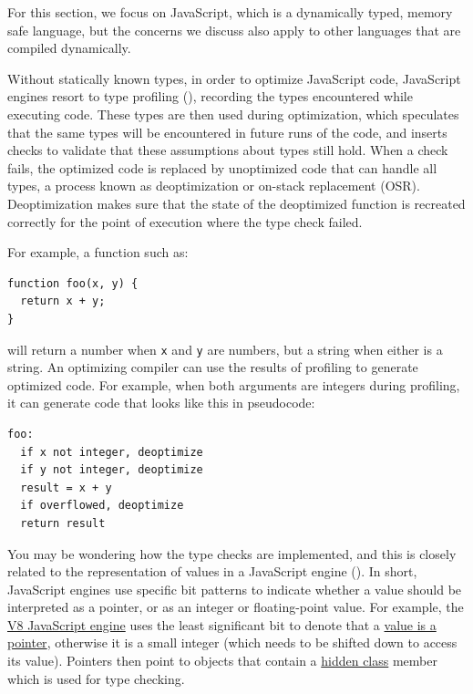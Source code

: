 \documentclass[
  a4paper,
]{report}
\begin{document}
For this section, we focus on JavaScript, which is a dynamically typed,
memory safe language, but the concerns we discuss also apply to other
languages that are compiled dynamically.

Without statically known types, in order to optimize JavaScript code,
JavaScript engines resort to type profiling
(), recording the types encountered
while executing code. These types are then used during optimization,
which speculates that the same types will be encountered in future runs
of the code, and inserts checks to validate that these assumptions about
types still hold. When a check fails, the optimized code is replaced by
unoptimized code that can handle all types, a process known as
\label{__index_entry_93}{deoptimization}
or \label{__index_entry_94}{on-stack replacement
(OSR)}. Deoptimization makes sure that
the state of the deoptimized function is recreated correctly for the
point of execution where the type check failed.

For example, a function such as:

\begin{verbatim}
function foo(x, y) {
  return x + y;
}
\end{verbatim}

will return a number when \texttt{x} and \texttt{y} are numbers, but a
string when either is a string. An optimizing compiler can use the
results of profiling to generate optimized code. For example, when both
arguments are integers during profiling, it can generate code that looks
like this in pseudocode:

\begin{verbatim}
foo:
  if x not integer, deoptimize
  if y not integer, deoptimize
  result = x + y
  if overflowed, deoptimize
  return result
\end{verbatim}

You may be wondering how the type checks are implemented, and this is
closely related to the representation of values in a JavaScript engine
(). In short, JavaScript engines use
specific bit patterns to indicate whether a value should be interpreted
as a pointer, or as an integer or floating-point value. For example, the
\href{https://v8.dev/}{V8 JavaScript engine} uses the least significant
bit to denote that a
\href{https://v8.dev/blog/pointer-compression\#value-tagging-in-v8}{value
is a pointer}, otherwise it is a small integer (which needs to be
shifted down to access its value). Pointers then point to objects that
contain a \href{https://v8.dev/docs/hidden-classes}{hidden class} member
which is used for type checking.
\end{document}
